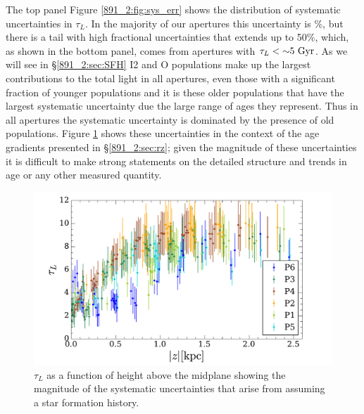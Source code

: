 The top panel Figure \ref{891_2:fig:sys_err} shows the distribution of
systematic uncertainties in $\tau_L$. In the majority of our apertures
this uncertainty is \%, but there is a tail with high
fractional uncertainties that extends up to 50\%, which, as shown in
the bottom panel, comes from apertures with $\tau_L < {\sim}
  5~\mathrm{Gyr} $. As we will see in \S\ref{891_2:sec:SFH} I2 and O populations
make up the largest contributions to the total light in all apertures,
even those with a significant fraction of younger populations and it
is these older populations that have the largest systematic
uncertainty due the large range of ages they represent. Thus in all
apertures the systematic uncertainty is dominated by the presence of
old populations. Figure \ref{891_2:fig:MLWA_sys_err} shows these
uncertainties in the context of the age gradients presented in
\S\ref{891_2:sec:rz}; given the magnitude of these uncertainties it is
difficult to make strong statements on the detailed structure and
trends in age or any other measured quantity.


\begin{figure}
  \centering
  \includegraphics[width=\columnwidth]{891_2/figs/MLWA_sys_err.pdf}
  \caption[Systematic $\tau_L$ uncertainties in relation to our data]
          {\fixspacing\label{891_2:fig:MLWA_sys_err}$\tau_L$ as a
            function of height above the midplane showing the
            magnitude of the systematic uncertainties that arise from
            assuming a star formation history.}
\end{figure}

